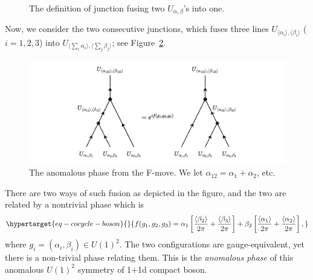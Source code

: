 \documentclass[
  letterpaper,
  DIV=11,
  numbers=noendperiod]{scrreport}
\begin{document}
\begin{figure}
\begin{minipage}[t]{0.60\linewidth}
{{}

}

\end{minipage}%

\caption{\label{fig-junction-def}The definition of junction fusing two
\(U_{\alpha,\beta}\)'s into one.}

\end{figure}

Now, we consider the two consecutive junctions, which fuses three lines
\(U_{\langle\alpha_i\rangle,\langle\beta_i\rangle}\) (\(i=1,2,3\)) into
\(U_{\langle\sum_i \alpha_i\rangle,\langle\sum_j \beta_j \rangle}\); see
Figure~\ref{fig-F-move}.

\begin{figure}[t]

{\centering \includegraphics{figures/f_move.pdf}

}

\caption{\label{fig-F-move}The anomalous phase from the F-move. We let
\(\alpha_{12} = \alpha_1+\alpha_2\), etc.}

\end{figure}

There are two ways of such fusion as depicted in the figure, and the two
are related by a nontrivial phase which is
\begin{equation}\protect\hypertarget{eq-cocycle-boson}{}{
f(g_1,g_2,g_3) = \alpha_1\left[\frac{\langle\beta_2\rangle}{2\pi}+\frac{\langle\beta_3\rangle}{2\pi}\right]+\beta_3\left[\frac{\langle\alpha_1\rangle}{2\pi}+\frac{\langle\alpha_2\rangle}{2\pi}\right],
}\label{eq-cocycle-boson}\end{equation} where
\(g_i = (\alpha_i,\beta_i)\in U(1)^2\). The two configurations are
gauge-equivalent, yet there is a non-trivial phase relating them. This
is the \emph{anomalous phase} of this anomalous \(U(1)^2\) symmetry of
1+1d compact boson.
\end{document}
